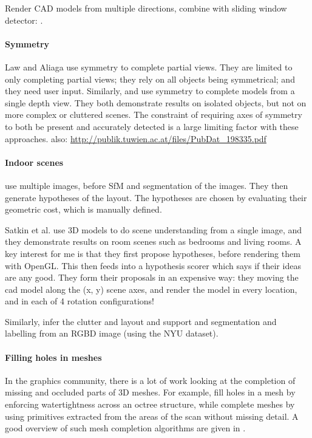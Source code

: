 \documentclass[10pt,twocolumn,letterpaper]{article}
\makeatletter
\newcommand*{\ea}{et al.\@\xspace}
\makeatother
\begin{document}
Render CAD models from multiple directions, combine with sliding window detector: \cite{song-eccv-2014}.


\paragraph{Symmetry}
Law and Aliaga \cite{law-cviu-2010} use symmetry to complete partial views. 
They are limited to only completing partial views; they rely on all objects being symmetrical; and they need user input.
Similarly, \cite{thrun-iccv-2005} and \cite{kroemer-humanoids-2012} use symmetry to complete models from a single depth view. 
They both demonstrate results on isolated objects, but not on more complex or cluttered scenes. 
The constraint of requiring axes of symmetry to both be present and accurately detected is a large limiting factor with these approaches.
also: \url{http://publik.tuwien.ac.at/files/PubDat_198335.pdf}


\paragraph{Indoor scenes}
\cite{bao-wacv-2014} use multiple images, before SfM and segmentation of the images. 
They then generate hypotheses of the layout. 
The hypotheses are chosen by evaluating their geometric cost, which is manually defined. 

Satkin \ea \cite{satkin-bmvc-2012} use 3D models to do scene understanding from a single image, and they demonstrate results on room scenes such as bedrooms and living rooms. 
A key interest for me is that they first propose hypotheses, before rendering them with OpenGL.
This then feeds into a hypothesis scorer which says if their ideas are any good. 
They form their proposals in an expensive way: they moving the cad model along the (x, y) scene axes, and render the model in every location, and in each of 4 rotation configurations!

Similarly, \cite{zhang-iccv-2013} infer the clutter and layout and support and segmentation and labelling from an RGBD image (using the NYU dataset).



\paragraph{Filling holes in meshes}
In the graphics community, there is a lot of work looking at the completion of missing and occluded parts of 3D meshes. 
For example, \cite{podolak-esgp-2005} fill holes in a mesh by enforcing watertightness across an octree structure, while \cite{schnabel-eurographics-2009} complete meshes by using primitives extracted from the areas of the scan without missing detail. 
A good overview of such mesh completion algorithms are given in \cite{ju-cst-2009}.
\end{document}
